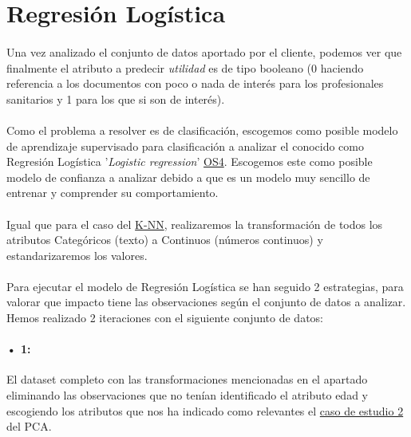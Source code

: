 \section{Regresión Logística}
\label{section:lr}

\paragraph{}
Una vez analizado el conjunto de datos aportado por el cliente, podemos ver que finalmente el atributo a predecir \textit{utilidad} es de tipo booleano (0 haciendo referencia a los documentos con poco o nada de interés para los profesionales sanitarios y 1 para los que si son de interés).

\paragraph{}
Como el problema a resolver es de clasificación, escogemos como posible modelo de aprendizaje supervisado para clasificación a analizar el conocido como Regresión Logística '\textit{Logistic regression}'\cite{ref:lr_def} \hyperref[os:OS4]{OS4}. Escogemos este como posible modelo de confianza a analizar debido a que es un modelo muy sencillo de entrenar y comprender su comportamiento\cite{ref:lr_understanding}.

\paragraph{}
Igual que para el caso del \hyperref[section:knn]{K-NN}, realizaremos la transformación de todos los atributos Categóricos (texto) a Continuos (números continuos) y estandarizaremos los valores.

\paragraph{}
Para ejecutar el modelo de Regresión Logística se han seguido 2 estrategias, para valorar que impacto tiene las observaciones según el conjunto de datos a analizar. Hemos realizado 2 iteraciones con el siguiente conjunto de datos:

\label{section:lr_casos}
\paragraph{• 1: } El dataset completo con las transformaciones mencionadas en el apartado  eliminando las observaciones que no tenían identificado el atributo edad y escogiendo los atributos que nos ha indicado como relevantes el \hyperref[result:pca_case2]{caso de estudio 2} del PCA.

